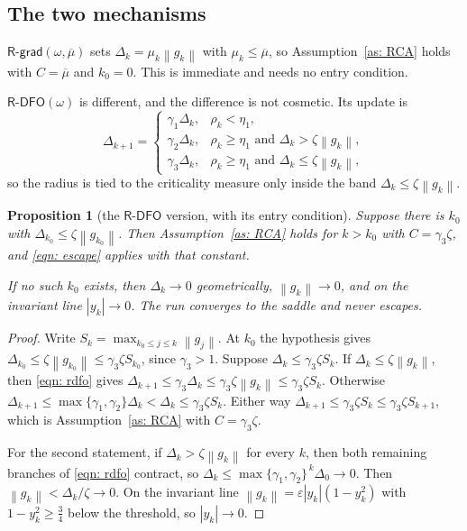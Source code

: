 \documentclass[11pt,a4paper]{article}
\providecommand{\abs}[1]{\left \vert #1 \right \vert}
\providecommand{\norm}[1]{\left \lVert #1 \right \rVert}
\providecommand{\Rdfo}{\textsf{R-DFO}}
\providecommand{\Rgrad}{\textsf{R-grad}}
\providecommand{\gone}{\gamma_1}
\providecommand{\gtwo}{\gamma_2}
\providecommand{\gthree}{\gamma_3}
\newtheorem{proposition}{Proposition}
\theoremstyle{definition}
\theoremstyle{remark}
\begin{document}
\subsection{The two mechanisms}\label{sec: mechanisms}

$\Rgrad(\omega,\overline{\mu})$ sets $\Delta_k = \mu_k\norm{g_k}$ with
$\mu_k \leq \overline{\mu}$, so Assumption~\ref{as: RCA} holds with
$C = \overline{\mu}$ and $k_0 = 0$. This is immediate and needs no entry
condition.

$\Rdfo(\omega)$ is different, and the difference is not cosmetic. Its update is
\begin{equation}
  \Delta_{k+1} =
  \begin{cases}
    \gone\Delta_k, & \rho_k < \eta_1, \\
    \gtwo\Delta_k, & \rho_k \geq \eta_1 \text{ and } \Delta_k > \zeta\norm{g_k}, \\
    \gthree\Delta_k, & \rho_k \geq \eta_1 \text{ and } \Delta_k \leq \zeta\norm{g_k},
  \end{cases}
  \label{eqn: rdfo}
\end{equation}
so the radius is tied to the criticality measure only inside the band
$\Delta_k \leq \zeta\norm{g_k}$.

\begin{proposition}[the \textnormal{$\Rdfo$} version, with its entry condition]
\label{prop: rdfo}
  Suppose there is $k_0$ with $\Delta_{k_0} \leq \zeta\norm{g_{k_0}}$. Then
  Assumption~\ref{as: RCA} holds for $k > k_0$ with $C = \gthree\zeta$, and
  \eqref{eqn: escape} applies with that constant.

  If no such $k_0$ exists, then $\Delta_k \to 0$ geometrically,
  $\norm{g_k} \to 0$, and on the invariant line $\abs{y_k} \to 0$. The run
  converges to the saddle and never escapes.
\end{proposition}

\begin{proof}
  Write $S_k = \max_{k_0 \leq j \leq k}\norm{g_j}$. At $k_0$ the hypothesis gives
  $\Delta_{k_0} \leq \zeta\norm{g_{k_0}} \leq \gthree\zeta S_{k_0}$, since
  $\gthree > 1$. Suppose $\Delta_k \leq \gthree\zeta S_k$. If
  $\Delta_k \leq \zeta\norm{g_k}$, then \eqref{eqn: rdfo} gives
  $\Delta_{k+1} \leq \gthree\Delta_k \leq \gthree\zeta\norm{g_k} \leq
  \gthree\zeta S_k$. Otherwise $\Delta_{k+1} \leq \max\{\gone,\gtwo\}\Delta_k
  < \Delta_k \leq \gthree\zeta S_k$. Either way
  $\Delta_{k+1} \leq \gthree\zeta S_k \leq \gthree\zeta S_{k+1}$, which is
  Assumption~\ref{as: RCA} with $C = \gthree\zeta$.

  For the second statement, if $\Delta_k > \zeta\norm{g_k}$ for every $k$, then
  both remaining branches of \eqref{eqn: rdfo} contract, so
  $\Delta_k \leq \max\{\gone,\gtwo\}^{\,k}\Delta_0 \to 0$. Then
  $\norm{g_k} < \Delta_k/\zeta \to 0$. On the invariant line
  $\norm{g_k} = \varepsilon\abs{y_k}(1-y_k^2)$ with $1 - y_k^2 \geq \tfrac34$
  below the threshold, so $\abs{y_k} \to 0$.
\end{proof}
\end{document}
